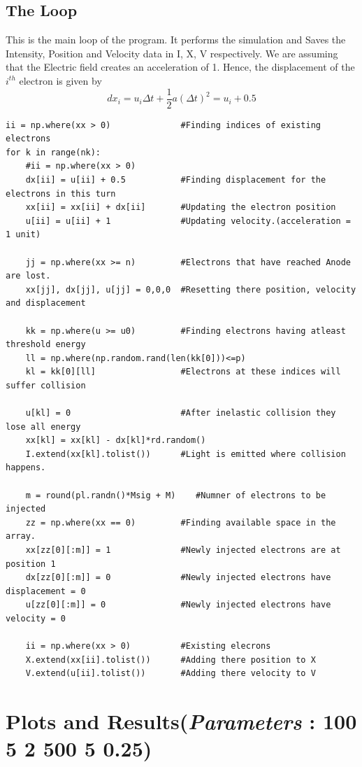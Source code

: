\documentclass[11pt, a4paper]{article}
\begin{document}
\subsection{The Loop}
    This is the main loop of the program. It performs the simulation and Saves the Intensity, Position and Velocity data in I, X, V respectively. We are assuming that the Electric field creates an acceleration of 1. Hence, the displacement of the $i^{th}$ electron is given by
    \begin{equation*}
        dx_i = u_i\Delta t + \frac{1}{2}a(\Delta t)^2 = u_i + 0.5
    \end{equation*}
    \begin{verbatim}
ii = np.where(xx > 0)              #Finding indices of existing electrons
for k in range(nk):
    #ii = np.where(xx > 0)
    dx[ii] = u[ii] + 0.5           #Finding displacement for the electrons in this turn
    xx[ii] = xx[ii] + dx[ii]       #Updating the electron position
    u[ii] = u[ii] + 1              #Updating velocity.(acceleration = 1 unit) 
    
    jj = np.where(xx >= n)         #Electrons that have reached Anode are lost.
    xx[jj], dx[jj], u[jj] = 0,0,0  #Resetting there position, velocity and displacement
    
    kk = np.where(u >= u0)         #Finding electrons having atleast threshold energy
    ll = np.where(np.random.rand(len(kk[0]))<=p)
    kl = kk[0][ll]                 #Electrons at these indices will suffer collision
    
    u[kl] = 0                      #After inelastic collision they lose all energy
    xx[kl] = xx[kl] - dx[kl]*rd.random()
    I.extend(xx[kl].tolist())      #Light is emitted where collision happens.
    
    m = round(pl.randn()*Msig + M)    #Numner of electrons to be injected
    zz = np.where(xx == 0)         #Finding available space in the array.
    xx[zz[0][:m]] = 1              #Newly injected electrons are at position 1
    dx[zz[0][:m]] = 0              #Newly injected electrons have displacement = 0          
    u[zz[0][:m]] = 0               #Newly injected electrons have velocity = 0
    
    ii = np.where(xx > 0)          #Existing elecrons
    X.extend(xx[ii].tolist())      #Adding there position to X
    V.extend(u[ii].tolist())       #Adding there velocity to V
    \end{verbatim}
\section{Plots and Results(\textit{Parameters} : 100 5 2 500 5 0.25)}
\end{document}
